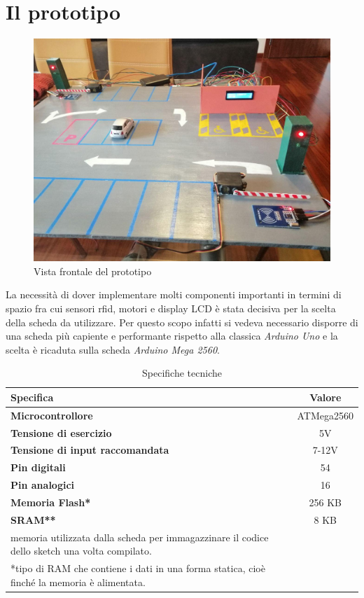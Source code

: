 \documentclass[a4paper,titlepage]{report}
\begin{document}
\section*{Il prototipo}
\begin{figure}[h]
\centering
\includegraphics[scale = 0.25]{progetto.jpg}
\caption{Vista frontale del prototipo}
\end{figure}
La necessità di dover implementare molti componenti importanti in termini di spazio fra cui sensori rfid, motori e display LCD è stata decisiva per la scelta della scheda da utilizzare. Per questo scopo infatti si vedeva necessario disporre di una scheda più capiente e performante rispetto alla classica {\itshape Arduino Uno} e la scelta è ricaduta sulla scheda {\itshape Arduino Mega 2560}.\\
\begin{table}[htb]
\caption{Specifiche tecniche}
\vspace{4mm}
\centering
\hspace*{-0.9in}
\begin{tabular}{l c}
\toprule
\textbf{Specifica} & \textbf{Valore} \\
\midrule
\textbf{Microcontrollore} & ATMega2560 \\
\textbf{Tensione di esercizio} & 5V \\
\textbf{Tensione di input raccomandata} & 7-12V \\
\textbf{Pin digitali} & 54 \\
\textbf{Pin analogici} & 16 \\
\textbf{Memoria Flash*} & 256 KB \\
\textbf{SRAM**} & 8 KB \\
\bottomrule
{\small *memoria utilizzata dalla scheda per immagazzinare il codice dello sketch una volta compilato.}\\
{\small **tipo di RAM che contiene i dati in una forma statica, cioè finché la memoria è alimentata.}
\end{tabular}
\end{table}
\end{document}
